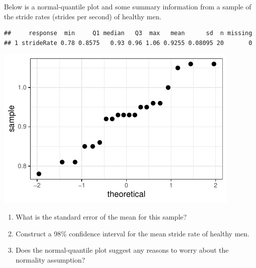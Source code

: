 \documentclass[twoside]{book}\usepackage[]{graphicx}\usepackage[]{xcolor}
\makeatletter
\def\maxwidth{ %
  \ifdim\Gin@nat@width>\linewidth
    \linewidth
  \else
    \Gin@nat@width
  \fi
}
\newenvironment{kframe}{%
 \def\at@end@of@kframe{}%
 \ifinner\ifhmode%
  \def\at@end@of@kframe{\end{minipage}}%
  \begin{minipage}{\columnwidth}%
 \fi\fi%
 \def\FrameCommand##1{\hskip\@totalleftmargin \hskip-\fboxsep
 \colorbox{shadecolor}{##1}\hskip-\fboxsep
     \hskip-\linewidth \hskip-\@totalleftmargin \hskip\columnwidth}%
 \MakeFramed {\advance\hsize-\width
   \@totalleftmargin\z@ \linewidth\hsize
   \@setminipage}}%
 {\par\unskip\endMakeFramed%
 \at@end@of@kframe}
\newenvironment{knitrout}{}{} %
\makeatother
\begin{document}
\begin{problem}
	Below is a normal-quantile plot and some summary information from a 
	sample of the stride rates (strides per second) 
	of healthy men.

\begin{knitrout}
\color{fgcolor}\begin{kframe}
\begin{verbatim}
##     response  min     Q1 median   Q3  max   mean      sd  n missing
## 1 strideRate 0.78 0.8575   0.93 0.96 1.06 0.9255 0.08095 20       0
\end{verbatim}
\end{kframe}

{\centering \includegraphics[width=\maxwidth]{figures/fig-unnamed-chunk-158-1} 

}



\end{knitrout}
	\begin{enumerate}
		\item
			What is the standard error of the mean for this sample?
		\item 
			Construct a 98\% confidence interval 
			for the mean stride rate of healthy men.  
		\item
			Does the normal-quantile plot suggest any reasons to worry about the 
			normality assumption?
	\end{enumerate}
\end{problem}
\end{document}
